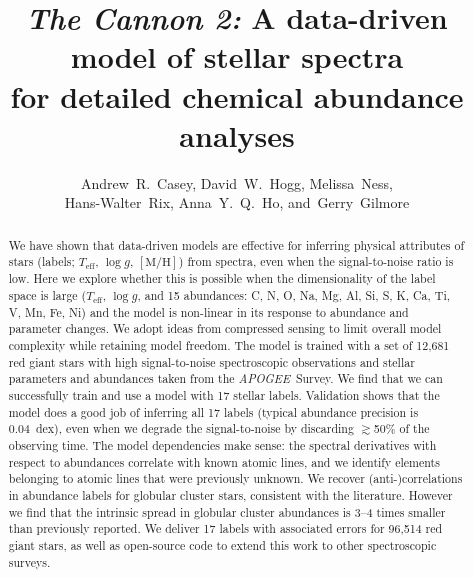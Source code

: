 \documentclass[12pt,preprint]{aastex}
\newcommand{\project}[1]{\textsl{#1}}
\newcommand{\acronym}[1]{{\small{#1}}}
\newcommand{\apogee}{\project{\acronym{APOGEE}}}
\newcommand{\logg}{\log g}
\newcommand{\mh}{\mathrm{[M/H]}}
\newcommand{\Teff}{T_{\mathrm{eff}}}
\begin{document}
\title{\textsl{The Cannon 2:} A data-driven model of stellar spectra \\
       for detailed chemical abundance analyses}
\author{Andrew~R.~Casey,
        David~W.~Hogg,
        Melissa~Ness,\\
        Hans-Walter~Rix,
        Anna~Y.~Q.~Ho,
    and~Gerry~Gilmore}


\begin{abstract}
We have shown that data-driven models are effective for inferring physical 
attributes of stars (labels; $\Teff$, $\logg$, $\mh$) from spectra, even when
the signal-to-noise ratio is low.
Here we explore whether this is possible when the dimensionality of the label
space is large ($\Teff$, $\logg$, and 15 abundances: C, N, O, Na, Mg, Al, Si, S, 
K, Ca, Ti, V, Mn, Fe, Ni) and the model is non-linear in its response to 
abundance and parameter changes.
We adopt ideas from compressed sensing to limit overall model complexity
while retaining model freedom.  The model is trained
with a set of 12,681 red giant stars with high signal-to-noise spectroscopic 
observations and stellar parameters and abundances taken from the \apogee\ 
Survey.
We find that we can successfully train and use a model with 17 stellar labels.
Validation shows that the model does a good job of inferring all 17 labels 
(typical abundance precision is 0.04~dex), even when we degrade the signal-to-noise by 
discarding $\gtrsim$50\% of the observing time. The model dependencies 
make sense: the spectral derivatives with respect to abundances correlate
with known atomic lines, and we identify elements belonging
to atomic lines that were previously unknown.  We recover (anti-)correlations
in abundance labels for globular cluster stars, consistent with the literature.
However we find that the intrinsic spread in globular cluster abundances is 3--4 times smaller than 
previously reported.  We deliver 17 labels with associated errors for 
96,514 red giant stars, as well as open-source code to extend this work to other spectroscopic surveys.
\end{abstract}
\end{document}

